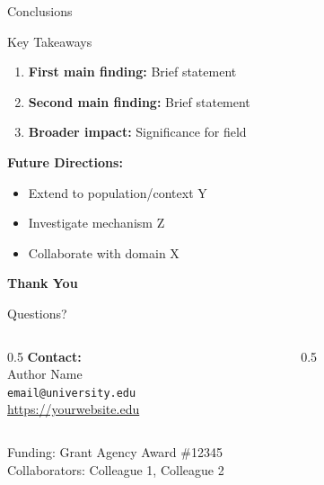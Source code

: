 \documentclass[aspectratio=169,11pt]{beamer}
\begin{document}
\begin{frame}{Conclusions}
  \begin{block}{Key Takeaways}
    \begin{enumerate}
      \item \textbf{First main finding:} Brief statement
      \item \textbf{Second main finding:} Brief statement
      \item \textbf{Broader impact:} Significance for field
    \end{enumerate}
  \end{block}

  \vspace{0.5cm}

  \textbf{Future Directions:}
  \begin{itemize}
    \item Extend to population/context Y
    \item Investigate mechanism Z
    \item Collaborate with domain X
  \end{itemize}
\end{frame}

\begin{frame}[plain]
  \begin{center}
    {\Large \textbf{Thank You}}

    \vspace{1cm}

    {\large Questions?}

    \vspace{1cm}

    \begin{columns}
      \begin{column}{0.5\textwidth}
        \textbf{Contact:}\\
        Author Name\\
        \texttt{email@university.edu}\\
        \url{https://yourwebsite.edu}
      \end{column}

      \begin{column}{0.5\textwidth}
      \end{column}
    \end{columns}

    \vspace{0.5cm}

    {\footnotesize
      Funding: Grant Agency Award \#12345\\
      Collaborators: Colleague 1, Colleague 2
    }
  \end{center}
\end{frame}
\end{document}
